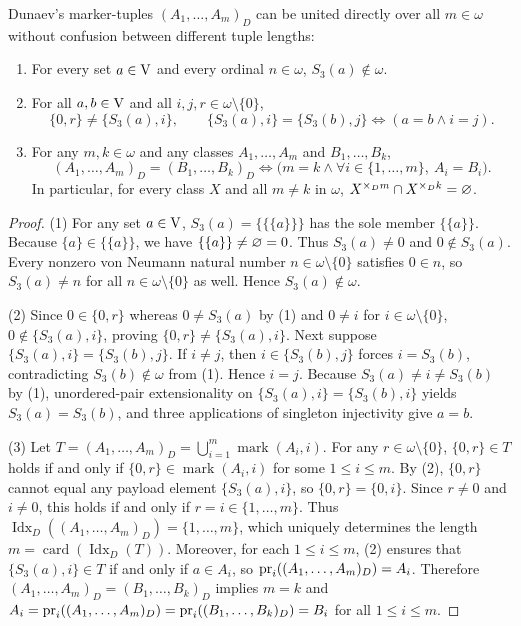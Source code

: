 \begin{theorem}
\label{thm:dunaev_kleene_star_disjointness}
Dunaev's marker-tuples $(A_1, \dots, A_m)_D$ can be united directly over all
$m \in \omega$ without confusion between different tuple lengths:
\begin{enumerate}
  \item For every set $a \in \mathrm{V}$ and every ordinal $n \in \omega$, $S_3(a) \notin \omega$.
  \item For all $a, b \in \mathrm{V}$ and all $i, j, r \in \omega \setminus \{0\}$,
  \[
  \{0, r\} \neq \{S_3(a), i\},\qquad
  \{S_3(a), i\} = \{S_3(b), j\} \iff (a = b \land i = j).
  \]
  \item For any $m, k \in \omega$ and any classes $A_1, \dots, A_m$ and $B_1, \dots, B_k$,
  \[
  (A_1, \dots, A_m)_D = (B_1, \dots, B_k)_D
  \iff
  \big(m = k \land \forall i \in \{1, \dots, m\},\ A_i = B_i\big).
  \]
  In particular, for every class $X$ and all $m \neq k$ in $\omega$,
  $X^{\times_D m} \cap X^{\times_D k} = \varnothing$.
\end{enumerate}
\end{theorem}
\begin{proof}
(1) For any set $a \in \mathrm{V}$, $S_3(a) = \{\{\{a\}\}\}$ has the sole member
$\{\{a\}\}$. Because $\{a\} \in \{\{a\}\}$, we have $\{\{a\}\} \neq \varnothing = 0$.
Thus $S_3(a) \neq 0$ and $0 \notin S_3(a)$. Every nonzero von Neumann natural
number $n \in \omega \setminus \{0\}$ satisfies $0 \in n$, so $S_3(a) \neq n$
for all $n \in \omega \setminus \{0\}$ as well. Hence $S_3(a) \notin \omega$.

(2) Since $0 \in \{0, r\}$ whereas $0 \neq S_3(a)$ by (1) and $0 \neq i$ for
$i \in \omega \setminus \{0\}$, $0 \notin \{S_3(a), i\}$, proving
$\{0, r\} \neq \{S_3(a), i\}$. Next suppose $\{S_3(a), i\} = \{S_3(b), j\}$.
If $i \neq j$, then $i \in \{S_3(b), j\}$ forces $i = S_3(b)$, contradicting
$S_3(b) \notin \omega$ from (1). Hence $i = j$. Because $S_3(a) \neq i \neq S_3(b)$
by (1), unordered-pair extensionality on $\{S_3(a), i\} = \{S_3(b), i\}$ yields
$S_3(a) = S_3(b)$, and three applications of singleton injectivity give $a = b$.

(3) Let $T = (A_1, \dots, A_m)_D = \bigcup_{i=1}^m \operatorname{mark}(A_i, i)$.
For any $r \in \omega \setminus \{0\}$, $\{0, r\} \in T$ holds if and only if
$\{0, r\} \in \operatorname{mark}(A_i, i)$ for some $1 \le i \le m$. By (2),
$\{0, r\}$ cannot equal any payload element $\{S_3(a), i\}$, so $\{0, r\} = \{0, i\}$.
Since $r \neq 0$ and $i \neq 0$, this holds if and only if $r = i \in \{1, \dots, m\}$.
Thus $\operatorname{Idx}_D((A_1, \dots, A_m)_D) = \{1, \dots, m\}$, which uniquely
determines the length $m = \operatorname{card}(\operatorname{Idx}_D(T))$.
Moreover, for each $1 \le i \le m$, (2) ensures that $\{S_3(a), i\} \in T$
if and only if $a \in A_i$, so $\mathrm{pr}_i((A_1, \dots, A_m)_D) = A_i$.
Therefore $(A_1, \dots, A_m)_D = (B_1, \dots, B_k)_D$ implies $m = k$ and
$A_i = \mathrm{pr}_i((A_1, \dots, A_m)_D) = \mathrm{pr}_i((B_1, \dots, B_k)_D) = B_i$ for all
$1 \le i \le m$.
\end{proof}

